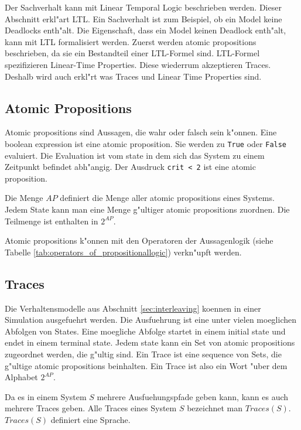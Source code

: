 \documentclass[11pt,twoside,a4paper]{article}
\begin{document}
 Der Sachverhalt kann mit Linear Temporal Logic beschrieben werden. Dieser Abschnitt erkl"art LTL. Ein Sachverhalt ist zum Beispiel, ob ein Model keine Deadlocks enth"alt. Die Eigenschaft, dass ein Model keinen Deadlock enth"alt, kann mit LTL formalisiert werden. Zuerst werden atomic propositions beschrieben, da sie ein Bestandteil einer LTL-Formel sind. LTL-Formel spezifizieren Linear-Time Properties. Diese wiederrum akzeptieren Traces. Deshalb wird auch erkl"rt was Traces und Linear Time Properties sind.

\subsection{Atomic Propositions}
\label{sec:atomicpropositions}

Atomic propositions sind Aussagen, die wahr oder falsch sein k"onnen. Eine boolean expression ist eine atomic proposition. Sie werden zu \verb|True| oder \verb|False| evaluiert. Die Evaluation ist vom state in dem sich das System zu einem Zeitpunkt befindet abh"angig. Der Ausdruck \verb|crit < 2| ist eine atomic proposition.

Die Menge $AP$ definiert die Menge aller atomic propositions eines Systems. Jedem State kann man eine Menge g"ultiger atomic propositions zuordnen. Die Teilmenge ist enthalten in $2^{AP}$.
 
Atomic propositions k"onnen mit den Operatoren der Aussagenlogik (siehe Tabelle \ref{tab:operators_of_propositionallogic}) verkn"upft werden.

\subsection{Traces}
\label{sec:traces}

Die Verhaltensmodelle aus Abschnitt \ref{sec:interleaving} koennen in einer Simulation ausgefuehrt werden. Die Ausfuehrung ist eine unter vielen moeglichen Abfolgen von States. Eine moegliche Abfolge startet in einem initial state und endet in einem terminal state. Jedem state kann ein Set von atomic propositions zugeordnet werden, die g"ultig sind. Ein Trace ist eine sequence von Sets, die g"ultige atomic propositions beinhalten. Ein Trace ist also ein Wort "uber dem Alphabet $2^{AP}$.

Da es in einem System $S$ mehrere Ausfuehungspfade geben kann, kann es auch mehrere Traces geben. Alle Traces eines System $S$ bezeichnet man $Traces(S)$. $Traces(S)$ definiert eine Sprache.
\end{document}
